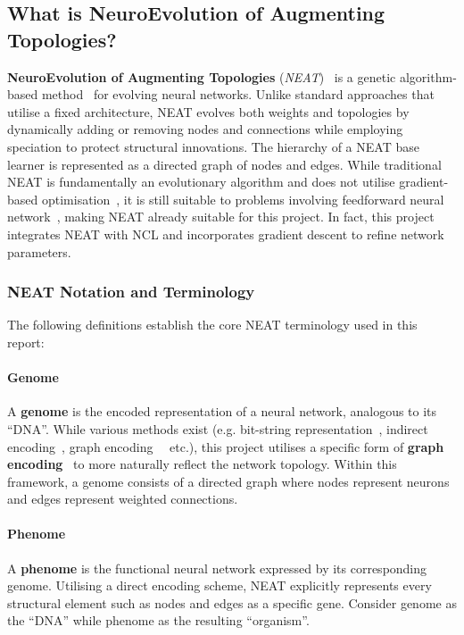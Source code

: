 \subsection{What is NeuroEvolution of Augmenting Topologies? }
\label{subsec:background_neat}
\textbf{NeuroEvolution of Augmenting Topologies} (\textit{NEAT})~\cite{stanley2002evolving} is a genetic algorithm-based method~\cite{miller1989designing} for evolving neural networks. Unlike standard approaches that utilise a fixed architecture, NEAT evolves both weights and topologies by dynamically adding or removing nodes and connections while employing speciation to protect structural innovations. The hierarchy of a NEAT base learner is represented as a directed graph of nodes and edges. While traditional NEAT is fundamentally an evolutionary algorithm and does not utilise gradient-based optimisation~\cite{rumelhart1986learning}, it is still suitable to problems involving feedforward neural network~\cite{montana1989training}, making NEAT already suitable for this project. In fact, this project integrates NEAT with NCL and incorporates gradient descent to refine network parameters. 

\subsubsection{NEAT Notation and Terminology}
The following definitions establish the core NEAT terminology used in this report: 

\paragraph{Genome}
A \textbf{genome} is the encoded representation of a neural network, analogous to its ``DNA''. While various methods exist (e.g. bit-string representation~\cite{schaffer1992combinations}, indirect encoding~\cite{stanley2009hypercube}, graph encoding~\cite{kitano1990designing}~\cite{pujol1998evolving} etc.), this project utilises a specific form of \textbf{graph encoding}~\cite{mcintyre_neat_python} to more naturally reflect the network topology. Within this framework, a genome consists of a directed graph where nodes represent neurons and edges represent weighted connections. 

\paragraph{Phenome}
A \textbf{phenome} is the functional neural network expressed by its corresponding genome. Utilising a direct encoding scheme, NEAT explicitly represents every structural element such as nodes and edges as a specific gene. Consider genome as the ``DNA'' while phenome as the resulting ``organism''. 

